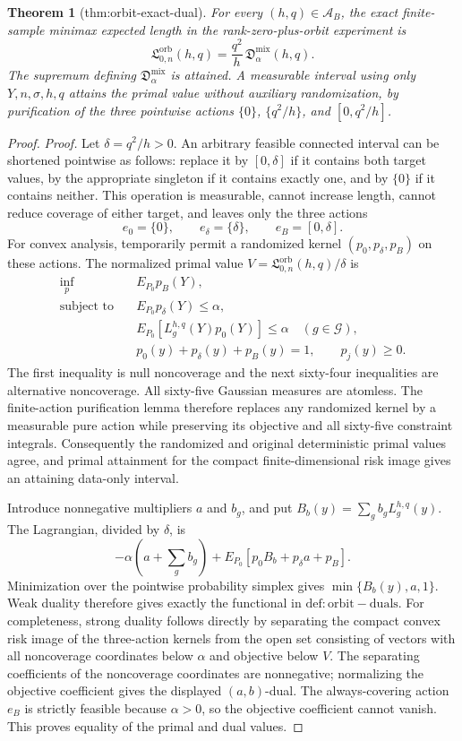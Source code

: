 \documentclass{article}
\newtheorem{theorem}{Theorem}
\begin{document}
\begin{theorem}[thm:orbit-exact-dual]\label{thm:orbit-exact-dual}
For every \((h,q)\in\mathcal A_B\), the exact finite-sample minimax expected length in the rank-zero-plus-orbit experiment is \[\mathfrak L_{0,n}^{\mathrm{orb}}(h,q)=\frac{q^2}{h}\,\mathfrak D_{\alpha}^{\mathrm{mix}}(h,q).\] The supremum defining \(\mathfrak D_{\alpha}^{\mathrm{mix}}\) is attained. A measurable interval using only \(Y,n,\sigma,h,q\) attains the primal value without auxiliary randomization, by purification of the three pointwise actions \(\{0\}\), \(\{q^2/h\}\), and \([0,q^2/h]\).
\end{theorem}
\begin{proof}
\textit{Proof.}
Let \(\delta=q^2/h>0\).  An arbitrary feasible connected interval can be
shortened pointwise as follows: replace it by \([0,\delta]\) if it contains
both target values, by the appropriate singleton if it contains exactly one,
and by \(\{0\}\) if it contains neither.  This operation is measurable, cannot
increase length, cannot reduce coverage of either target, and leaves only the
three actions
\[
e_0=\{0\},\qquad e_\delta=\{\delta\},\qquad
e_B=[0,\delta].
\]
For convex analysis, temporarily permit a randomized kernel
\((p_0,p_\delta,p_B)\) on these actions.  The normalized primal value
\(V=\mathfrak L_{0,n}^{\mathrm{orb}}(h,q)/\delta\) is
\[
\begin{split}
\inf_p\quad &E_{P_0}p_B(Y),\\
\text{subject to}\quad
&E_{P_0}p_\delta(Y)\leq\alpha,\\
&E_{P_0}[L_g^{h,q}(Y)p_0(Y)]\leq\alpha
\quad(g\in\mathcal G),\\
&p_0(y)+p_\delta(y)+p_B(y)=1,\qquad p_j(y)\geq0.
\end{split}
\]
The first inequality is null noncoverage and the next sixty-four inequalities
are alternative noncoverage.  All sixty-five Gaussian measures are atomless.
The finite-action purification lemma therefore replaces any randomized kernel
by a measurable pure action while preserving its objective and all sixty-five
constraint integrals.  Consequently the randomized and original deterministic
primal values agree, and primal attainment for the compact finite-dimensional
risk image gives an attaining data-only interval.

Introduce nonnegative multipliers \(a\) and \(b_g\), and put
\(B_b(y)=\sum_gb_gL_g^{h,q}(y)\).  The Lagrangian, divided by \(\delta\), is
\[
-\alpha\!\left(a+\sum_gb_g\right)
+E_{P_0}\!\left[p_0B_b+p_\delta a+p_B\right].
\]
Minimization over the pointwise probability simplex gives
\(\min\{B_b(y),a,1\}\).  Weak duality therefore gives exactly the functional
in \(\mathrm{def:orbit-duals}\).  For completeness, strong duality follows
directly by separating the compact convex risk image of the three-action
kernels from the open set consisting of vectors with all noncoverage
coordinates below \(\alpha\) and objective below \(V\).  The separating
coefficients of the noncoverage coordinates are nonnegative; normalizing the
objective coefficient gives the displayed \((a,b)\)-dual.  The always-covering
action \(e_B\) is strictly feasible because \(\alpha>0\), so the objective
coefficient cannot vanish.  This proves equality of the primal and dual values.


\end{proof}
\end{document}
